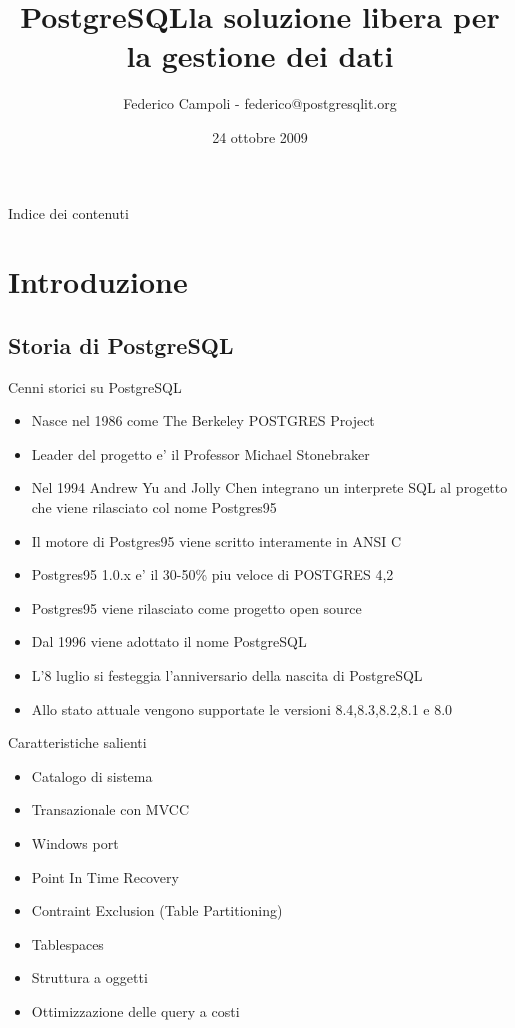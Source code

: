 \documentclass{beamer}
\title[PostgreSQL Italia]{PostgreSQL\newline la soluzione libera per la gestione dei dati}
\author{Federico Campoli - federico@postgresqlit.org}
\institute{Linux Day 2009, Gruppo Utenti Linux Pisa (GULP)}
\date{24 ottobre 2009}
\begin{document}
\begin{frame}
\titlepage 

\end{frame}

\begin{frame}{Indice dei contenuti}
\tableofcontents

\end{frame}


\section{Introduzione}
\subsection{Storia di PostgreSQL}
\begin{frame}{Cenni storici su PostgreSQL}
 \begin{itemize}
\pause \item Nasce nel 1986 come The Berkeley POSTGRES Project
\pause \item Leader del progetto e' il Professor Michael Stonebraker
\pause \item Nel 1994 Andrew Yu and Jolly Chen integrano un interprete SQL al progetto che viene rilasciato col nome Postgres95
\pause \item Il motore di Postgres95 viene scritto interamente in ANSI C
\pause \item Postgres95 1.0.x e' il 30-50\% piu veloce di POSTGRES 4,2
\pause \item Postgres95 viene rilasciato come progetto open source
\pause \item Dal 1996 viene adottato il nome PostgreSQL
\pause \item L'8 luglio si festeggia l'anniversario della nascita di PostgreSQL
\pause \item Allo stato attuale vengono supportate le versioni 8.4,8.3,8.2,8.1 e 8.0
 \end{itemize}
\end{frame}


\begin{frame}{Caratteristiche salienti}
 \begin{itemize}
\pause \item Catalogo di sistema
\pause \item Transazionale con MVCC 
\pause \item Windows port
\pause \item Point In Time Recovery
\pause \item Contraint Exclusion (Table Partitioning)
\pause \item Tablespaces
\pause \item Struttura a oggetti
\pause \item Ottimizzazione delle query a costi
\end{itemize}
\end{frame}
\end{document}
